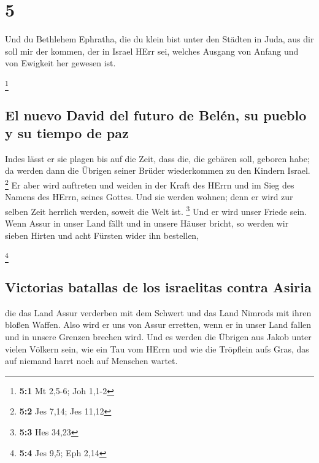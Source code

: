 \hypertarget{section-4}{%
\section{5}\label{section-4}}

 Und du Bethlehem Ephratha, die du klein bist unter den
Städten in Juda, aus dir soll mir der kommen, der in Israel HErr sei,
welches Ausgang von Anfang und von Ewigkeit her gewesen ist.

\footnote{\textbf{5:1} Mt 2,5-6; Joh 1,1-2}

\hypertarget{el-nuevo-david-del-futuro-de-beluxe9n-su-pueblo-y-su-tiempo-de-paz}{%
\subsection{El nuevo David del futuro de Belén, su pueblo y su tiempo de
paz}\label{el-nuevo-david-del-futuro-de-beluxe9n-su-pueblo-y-su-tiempo-de-paz}}

 Indes lässt er sie plagen bis auf die Zeit, dass die, die
gebären soll, geboren habe; da werden dann die Übrigen seiner Brüder
wiederkommen zu den Kindern Israel. \footnote{\textbf{5:2} Jes 7,14; Jes
  11,12}  Er aber wird auftreten und weiden in der Kraft
des HErrn und im Sieg des Namens des HErrn, seines Gottes. Und sie
werden wohnen; denn er wird zur selben Zeit herrlich werden, soweit die
Welt ist. \footnote{\textbf{5:3} Hes 34,23}  Und er wird
unser Friede sein. Wenn Assur in unser Land fällt und in unsere Häuser
bricht, so werden wir sieben Hirten und acht Fürsten wider ihn
bestellen,

\footnote{\textbf{5:4} Jes 9,5; Eph 2,14}

\hypertarget{victorias-batallas-de-los-israelitas-contra-asiria}{%
\subsection{Victorias batallas de los israelitas contra
Asiria}\label{victorias-batallas-de-los-israelitas-contra-asiria}}

 die das Land Assur verderben mit dem Schwert und das Land
Nimrods mit ihren bloßen Waffen. Also wird er uns von Assur erretten,
wenn er in unser Land fallen und in unsere Grenzen brechen wird.
 Und es werden die Übrigen aus Jakob unter vielen Völkern
sein, wie ein Tau vom HErrn und wie die Tröpflein aufs Gras, das auf
niemand harrt noch auf Menschen wartet.

